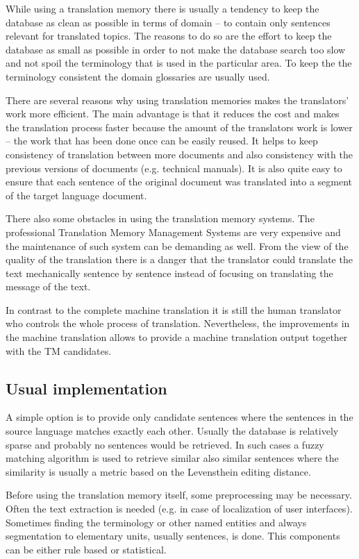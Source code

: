 While using a translation memory there is usually a tendency to keep the database as clean as possible in terms of domain -- to contain only sentences relevant for translated topics. The reasons to do so are the effort to keep the database as small as possible in order to not make the database search too slow and not spoil the terminology that is used in the particular area. To keep the the terminology consistent the domain glossaries are usually used.

There are several reasons why using translation memories makes the translators' work more efficient. The main advantage is that it reduces the cost and makes the translation process faster because the amount of the translators work is lower -- the work that has been done once can be easily reused. It helps to keep consistency of translation between more documents and also consistency with the previous versions of documents (e.g. technical manuals). It is also quite easy to ensure that each sentence of the original document was translated into a segment of the target language document.

There also some obstacles in using the translation memory systems. The professional Translation Memory Management Systems are very expensive and the maintenance of such system can be demanding as well. From the view of the quality of the translation there is a danger that the translator could translate the text mechanically sentence by sentence instead of focusing on translating the message of the text.

In contrast to the complete machine translation it is still the human translator who controls the whole process of translation. Nevertheless, the improvements in the machine translation allows to provide a machine translation output together with the TM candidates.

\subsection{Usual implementation}

A simple option is to provide only candidate sentences where the sentences in the source language matches exactly each other. Usually the database is relatively sparse and probably no sentences would be retrieved. In such cases a fuzzy matching algorithm is used to retrieve similar also similar sentences where the similarity is usually a metric based on the Levensthein editing distance.

Before using the translation memory itself, some preprocessing may be necessary. Often the text extraction is needed (e.g. in case of localization of user interfaces). Sometimes finding the terminology or other named entities and always segmentation to elementary units, usually sentences, is done. This components can be either rule based or statistical. 

